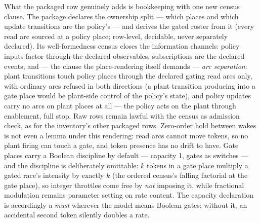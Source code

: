 What the packaged row genuinely adds is bookkeeping with one new
census clause. The package declares the ownership split --- which
places and which update transitions are the policy's --- and derives
the gated roster from it (every read arc sourced at a policy place;
row-level, decidable, never separately declared). Its well-formedness
census closes the information channels: policy inputs factor through
the declared observables, subscriptions are the declared events, and
--- the clause the place-rendering itself demands ---
\emph{arc separation}: plant transitions touch policy places through
the declared gating read arcs only, with ordinary arcs refused in
both directions (a plant transition producing into a gate place would
be plant-side control of the policy's state), and policy updates
carry no arcs on plant places at all --- the policy acts on the plant
through enablement, full stop. Raw rows remain lawful with the census
as admission check, as for the inventory's other packaged rows.
Zero-order hold between wakes is not even a lemma under this
rendering: read arcs cannot move tokens, so no plant firing can touch
a gate, and token presence has no drift to have. Gate places carry a
Boolean discipline by default --- capacity 1, gates as switches ---
and the discipline is deliberately omittable: $k$ tokens in a gate
place multiply a gated race's intensity by exactly $k$ (the ordered
census's falling factorial at the gate place), so integer throttles
come free by \emph{not} imposing it, while fractional modulation
remains parameter setting on rate content. The capacity declaration
is accordingly a \emph{must} wherever the model means Boolean gates:
without it, an accidental second token silently doubles a rate.

